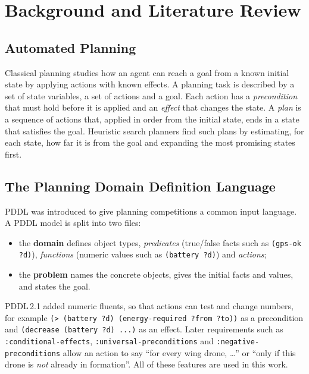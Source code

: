 \documentclass[11pt,a4paper,oneside]{report}
\newcommand{\code}[1]{\texttt{#1}}
\begin{document}
\chapter{Background and Literature Review}\label{ch:background}

\section{Automated Planning}
Classical planning studies how an agent can reach a goal from a known initial state by applying
actions with known effects. A planning task is described by a set of
state variables, a set of actions and a goal. Each action has a \emph{precondition} that must
hold before it is applied and an \emph{effect} that changes the state. A \emph{plan} is a sequence
of actions that, applied in order from the initial state, ends in a state that satisfies the
goal. Heuristic search planners find such plans by estimating, for each state, how far it is
from the goal and expanding the most promising states first.

\section{The Planning Domain Definition Language}
PDDL was introduced to give planning competitions a common input
language. A PDDL model is split into two files:
\begin{itemize}
  \item the \textbf{domain} defines object types, \emph{predicates} (true/false facts such as
        \code{(gps-ok ?d)}), \emph{functions} (numeric values such as \code{(battery ?d)}) and
        \emph{actions};
  \item the \textbf{problem} names the concrete objects, gives the initial facts and values, and
        states the goal.
\end{itemize}
PDDL\,2.1 added numeric fluents, so that actions can test and change numbers, for example
\code{(> (battery ?d) (energy-required ?from ?to))} as a precondition and
\code{(decrease (battery ?d) ...)} as an effect. Later requirements such as
\code{:conditional-effects}, \code{:universal-preconditions} and \code{:negative-preconditions}
allow an action to say ``for every wing drone, \ldots'' or ``only if this drone is \emph{not}
already in formation''. All of these features are used in this work.
\end{document}
